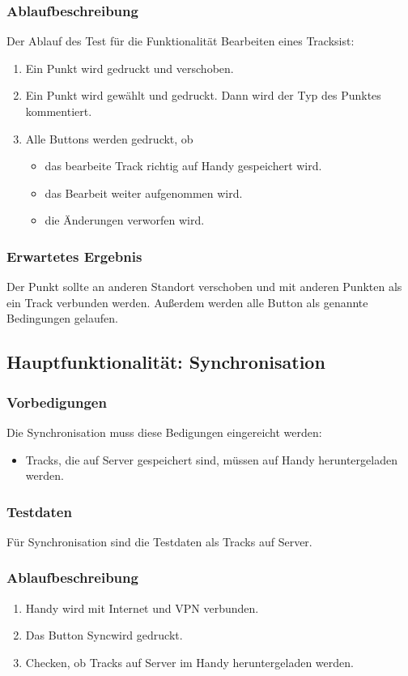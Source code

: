 \documentclass{article}
\begin{document}
\subsubsection{Ablaufbeschreibung}
	Der Ablauf des Test für die Funktionalität \glqq Bearbeiten eines Tracks\grqq ist:
	\begin{enumerate}
		\item Ein Punkt wird gedruckt und verschoben.
		\item Ein Punkt wird gewählt und gedruckt. Dann wird der Typ des Punktes kommentiert.
		\item Alle Buttons werden gedruckt, ob
			\begin{itemize}
				\item das bearbeite Track richtig auf Handy gespeichert wird.
				\item das Bearbeit weiter aufgenommen wird.
				\item die Änderungen verworfen wird.
			\end{itemize}
	\end{enumerate}
\subsubsection{Erwartetes Ergebnis}
	Der Punkt sollte an anderen Standort verschoben und mit anderen Punkten als ein Track verbunden werden. Außerdem werden alle Button als genannte Bedingungen gelaufen.

\subsection{Hauptfunktionalität: Synchronisation}
\subsubsection{Vorbedigungen}
	Die Synchronisation muss diese Bedigungen eingereicht werden:
	\begin{itemize}
		\item Tracks, die auf Server gespeichert sind, müssen auf Handy heruntergeladen werden.
	\end{itemize}
\subsubsection{Testdaten}
	Für Synchronisation sind die Testdaten als Tracks auf Server.
\subsubsection{Ablaufbeschreibung}
	\begin{enumerate}
		\item Handy wird mit Internet und VPN verbunden.
		\item Das Button \glqq Sync\grqq wird gedruckt.
		\item Checken, ob Tracks auf Server im Handy heruntergeladen werden.
	\end{enumerate}
\end{document}
